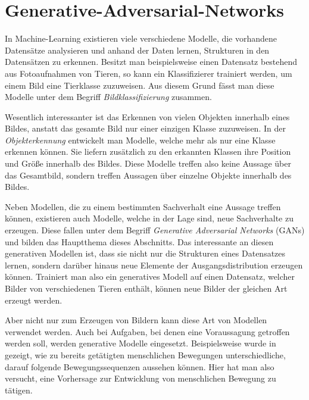 \section{Generative-Adversarial-Networks}\label{chapter:gans}
In Machine-Learning existieren viele verschiedene Modelle, die vorhandene
Datensätze analysieren und anhand der Daten lernen, Strukturen in den
Datensätzen zu erkennen.  Besitzt man beispielsweise einen Datensatz
bestehend aus Fotoaufnahmen von Tieren, so kann ein Klassifizierer trainiert
werden, um einem Bild eine Tierklasse zuzuweisen. Aus diesem Grund fässt man
diese Modelle unter dem Begriff \textit{Bildklassifizierung} zusammen.

Wesentlich interessanter ist das Erkennen von vielen Objekten innerhalb eines
Bildes, anstatt das gesamte Bild nur einer einzigen Klasse zuzuweisen. In der
\textit{Objekterkennung} entwickelt man Modelle, welche mehr als nur eine
Klasse erkennen können. Sie liefern zusätzlich zu den erkannten Klassen ihre
Position und Größe innerhalb des Bildes. Diese Modelle treffen also keine
Aussage über das Gesamtbild, sondern treffen Aussagen über einzelne Objekte
innerhalb des Bildes.

Neben Modellen, die zu einem bestimmten Sachverhalt eine Aussage treffen
können, existieren auch Modelle, welche in der Lage sind, neue Sachverhalte zu
erzeugen. Diese fallen unter dem Begriff \textit{Generative Adversarial
Networks} (GANs) und bilden das Hauptthema dieses Abschnitts. Das interessante
an diesen generativen Modellen ist, dass sie nicht nur die Strukturen eines
Datensatzes lernen, sondern darüber hinaus neue Elemente der
Ausgangsdistribution erzeugen können. Trainiert man also ein generatives
Modell auf einen Datensatz, welcher Bilder von verschiedenen Tieren enthält,
können neue Bilder der gleichen Art erzeugt werden.

Aber nicht nur zum Erzeugen von Bildern kann diese Art von Modellen verwendet
werden. Auch bei Aufgaben, bei denen eine Voraussagung getroffen werden soll,
werden generative Modelle eingesetzt. Beispielsweise wurde in
\cite{barsoum2017hpgan} gezeigt, wie zu bereits getätigten menschlichen
Bewegungen unterschiedliche, darauf folgende Bewegungssequenzen aussehen
können. Hier hat man also versucht, eine Vorhersage zur Entwicklung von
menschlichen Bewegung zu tätigen.

